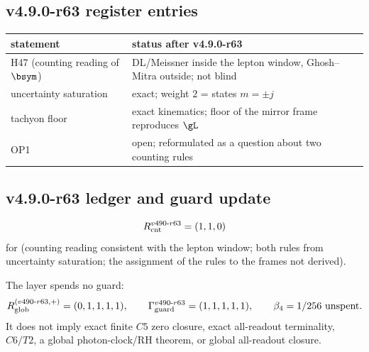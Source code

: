\subsection*{v4.9.0-r63 register entries}
\label{subsec:v490-r63-register}

\begin{center}
\small
\begin{tabular}{@{}>{\raggedright\arraybackslash}p{}>{\raggedright\arraybackslash}p{}@{}}
\toprule
statement & status after v4.9.0-r63\\
\midrule
H47 (counting reading of \(\bsym\)) & DL/Meissner inside the lepton window, Ghosh--Mitra outside; not blind\\
uncertainty saturation & exact; weight \(2\) = states \(m=\pm j\)\\
tachyon floor & exact kinematics; floor of the mirror frame reproduces \(\gL\)\\
OP1 & open; reformulated as a question about two counting rules\\
\bottomrule
\end{tabular}
\end{center}

\subsection*{v4.9.0-r63 ledger and guard update}
\label{subsec:v490-r63-ledger-guard}

\[
R_{\rm cnt}^{v490\text{-}r63}=(1,1,0)
\]
for (counting reading consistent with the lepton window; both rules from uncertainty saturation; the assignment of the rules to the frames not derived).

The layer spends no guard:
\[
R_{\rm glob}^{(v490\text{-}r63,+)}=(0,1,1,1,1),
\qquad
\Gamma_{\rm guard}^{v490\text{-}r63}=(1,1,1,1,1),
\qquad
\beta_4=1/256\ \text{unspent}.
\]
It does not imply exact finite \(C5\) zero closure, exact all-readout terminality,
\(C6/T2\), a global photon-clock/RH theorem, or global all-readout closure.

